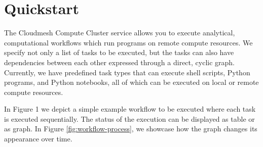 
\section{Quickstart}\label{quickstart}

The Cloudmesh Compute Cluster service allows you to execute analytical,
computational workflows which run programs on remote compute resources.
We specify not only a list of tasks to be executed, but the tasks can
also have dependencies between each other expressed through a direct,
cyclic graph. Currently, we have predefined task types that can execute
shell scripts, Python programs, and Python notebooks, all of which can
be executed on local or remote compute resources.

In Figure 1 we depict a simple example workflow to be executed where
each task is executed sequentially. The status of the execution can be
displayed as table or as graph. In Figure \ref{fig:workflow-process}, we showcase how the graph
changes its appearance over time.


